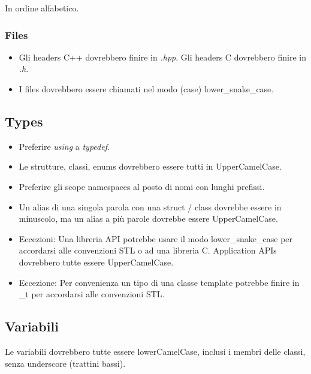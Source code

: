 \textsf{\small In ordine alfabetico.} \\

\subsubsection{Files}

\begin{itemize}
	\item \textsf{\small Gli headers C++ dovrebbero finire in \emph{.hpp}. Gli headers C dovrebbero finire in \emph{.h}.}
	\item \textsf{\small I files dovrebbero essere chiamati nel modo (case) lower\_snake\_case.}
\end{itemize}

\subsection{Types}

\begin{itemize}
	\item \textsf{\small Preferire \emph{using} a \emph{typedef}.}
	\item \textsf{\small Le strutture, classi, enums dovrebbero essere tutti in UpperCamelCase.}
	\item \textsf{\small Preferire gli scope namespaces al posto di nomi con lunghi prefissi.}
	\item \textsf{\small Un alias di una singola parola con una struct / class dovrebbe essere in minuscolo, ma un alias a più parole dovrebbe essere UpperCamelCase.}
	\item \textsf{\small Eccezioni: Una libreria API potrebbe usare il modo lower\_snake\_case per accordarsi alle convenzioni STL o ad una libreria C. Application APIs dovrebbero tutte essere UpperCamelCase.}
	\item \textsf{\small Eccezione: Per convenienza un tipo di una classe template potrebbe finire in \_t per accordarsi alle convenzioni STL.}
\end{itemize}

\subsection{Variabili}

\textsf{\small Le variabili dovrebbero tutte essere lowerCamelCase, inclusi i membri delle classi, senza underscore (trattini bassi).} \\

